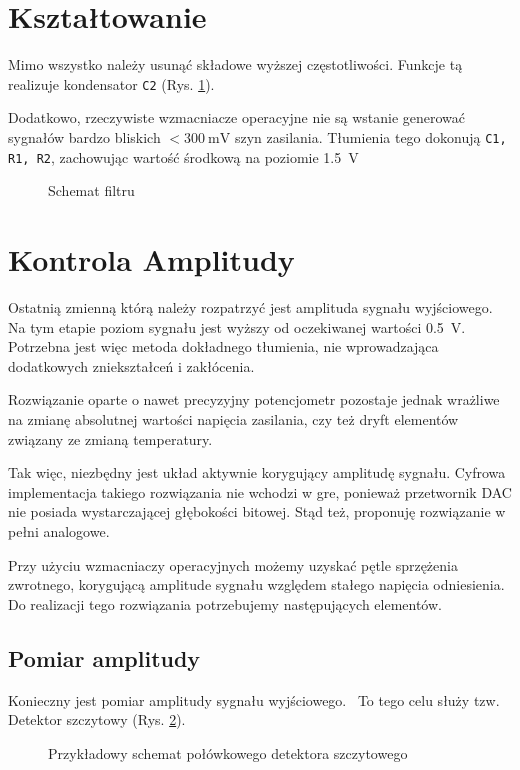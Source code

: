 \documentclass[12pt, a4paper]{article}
\begin{document}
\section{Kształtowanie}
Mimo wszystko należy usunąć składowe wyższej częstotliwości. Funkcje tą realizuje kondensator \verb|C2| (Rys. \ref{fig:filter}).

Dodatkowo, rzeczywiste wzmacniacze operacyjne nie są wstanie generować sygnałów bardzo bliskich $<\qty{300}{\mV}$ szyn zasilania.
Tłumienia tego dokonują \verb|C1, R1, R2|, zachowując wartość środkową na poziomie \qty{1,5}{\V}

\begin{figure}[h]
	\centering
	
	\caption{Schemat filtru}
	\label{fig:filter}
\end{figure}

\section{Kontrola Amplitudy}

Ostatnią zmienną którą należy rozpatrzyć jest amplituda sygnału wyjściowego. Na tym etapie poziom sygnału jest wyższy od oczekiwanej wartości
\qty{0,5}{\V}. Potrzebna jest więc metoda dokładnego tłumienia, nie wprowadzająca dodatkowych zniekształceń i zakłócenia.

Rozwiązanie oparte o nawet precyzyjny potencjometr pozostaje jednak wrażliwe na zmianę absolutnej wartości napięcia zasilania,
czy też dryft elementów związany ze zmianą temperatury.

Tak więc, niezbędny jest układ aktywnie korygujący amplitudę sygnału.
Cyfrowa implementacja takiego rozwiązania nie wchodzi w gre, 
ponieważ przetwornik DAC nie posiada wystarczającej głębokości bitowej. 
Stąd też, proponuję rozwiązanie w pełni analogowe.

Przy użyciu wzmacniaczy operacyjnych możemy uzyskać pętle sprzężenia zwrotnego, 
korygującą amplitude sygnału względem stałego napięcia odniesienia.
Do realizacji tego rozwiązania potrzebujemy następujących elementów.

\subsection{Pomiar amplitudy}
Konieczny jest pomiar amplitudy sygnału wyjściowego. \
To tego celu służy tzw. Detektor szczytowy (Rys. \ref{fig:peak-detector-schematic}). 

\begin{figure}[h]
	\centering
	
	\caption{Przykładowy schemat połówkowego detektora szczytowego}
	\label{fig:peak-detector-schematic}
\end{figure}
\end{document}
